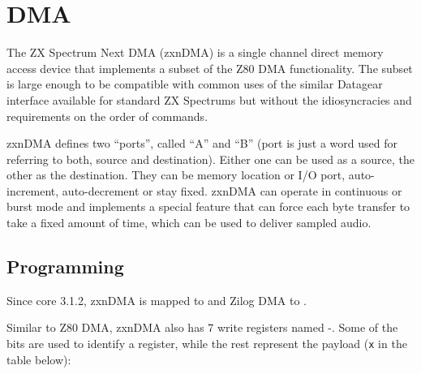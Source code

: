 \section{DMA}
\label{zx_next_dma}




The ZX Spectrum Next DMA (zxnDMA) is a single channel direct memory access device that implements a subset of the Z80 DMA functionality. The subset is large enough to be compatible with common uses of the similar Datagear interface available for standard ZX Spectrums but without the idiosyncracies and requirements on the order of commands.

zxnDMA defines two ``ports'', called ``A'' and ``B'' (port is just a word used for referring to both, source and destination). Either one can be used as a source, the other as the destination. They can be memory location or I/O port, auto-increment, auto-decrement or stay fixed. zxnDMA can operate in continuous or burst mode and implements a special feature that can force each byte transfer to take a fixed amount of time, which can be used to deliver sampled audio.


\subsection{Programming}

Since core 3.1.2, zxnDMA is mapped to  and Zilog DMA to .

Similar to Z80 DMA, zxnDMA also has 7 write registers named -. Some of the bits are used to identify a register, while the rest represent the payload ({\tt x} in the table below):

